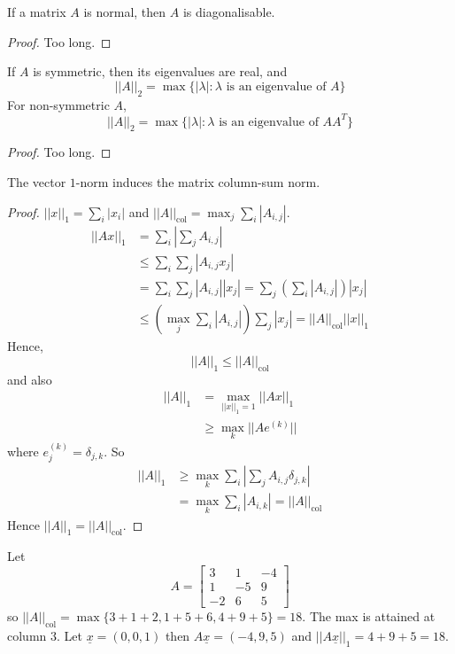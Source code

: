 \begin{theorem}
	If a matrix $A$ is normal, then $A$ is diagonalisable.
\end{theorem}

\begin{proof}
	Too long.
\end{proof}

\begin{theorem}
	If $A$ is symmetric, then its eigenvalues are real, and
	\[
		||A||_2 = \max \{ |\lambda|: \lambda \text{ is an eigenvalue of } A \}
	\]
	For non-symmetric $A$,
	\[
		||A||_2 = \max \{ |\lambda|: \lambda \text{ is an eigenvalue of } A A^T \}
	\]
\end{theorem}

\begin{proof}
	Too long.
\end{proof}

\begin{proposition}
	The vector $1$-norm induces the matrix column-sum norm.
\end{proposition}

\begin{proof}
	$||x||_1 = \sum_i |x_i|$ and $||A||_{\text{col}} = \max_j \sum_i |A_{i, j}|$.
	\[
		\begin{aligned}
			||A x||_1
				& = \sum_i \left| \sum_j A_{i, j} \right| \\
				& \le \sum_i \sum_j |A_{i, j} x_j| \\
				& = \sum_i \sum_j |A_{i, j}| |x_j| = \sum_j \left( \sum_i |A_{i, j}| \right) |x_j| \\
				& \le \left( \max_j \sum_i |A_{i, j}| \right) \sum_j |x_j| = ||A||_{\text{col}} ||x||_1
		\end{aligned}
	\]
	Hence,
	\[
		||A||_1 \le ||A||_\text{col}
	\]
	and also
	\[
		\begin{aligned}
			||A||_1
				& = \max_{||x||_1 = 1} ||A x||_1 \\
				& \ge \max_k ||A e^{(k)} ||
		\end{aligned}
	\]
	where $e_j^{(k)} = \delta_{j, k}$. So
	\[
		\begin{aligned}
			||A||_1
				& \ge \max_k \sum_i \left| \sum_j A_{i, j} \delta_{j, k} \right| \\
				& = \max_k \sum_i |A_{i, k}| = ||A||_\text{col}
		\end{aligned}
	\]
	Hence $||A||_1 = ||A||_\text{col}$.
\end{proof}

\begin{example}
	Let
	\[
		A = \begin{bmatrix}
			3 & 1 & -4 \\
			1 & -5 & 9 \\
			-2 & 6 & 5
		\end{bmatrix}
	\]
	so $||A||_{\text{col}} = \max \{ 3 + 1 + 2, 1 + 5 + 6, 4 + 9 + 5 \} = 18$. The max is attained at column $3$. Let $\underline{x} = (0, 0, 1)$ then $A \underline{x} = (-4, 9, 5)$ and $||A \underline{x}||_1 = 4 + 9 + 5 = 18$.
\end{example}

